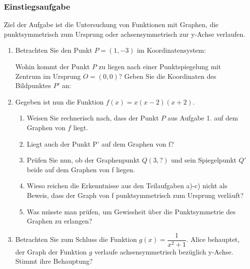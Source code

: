 \subsubsection{Einstiegsaufgabe}
Ziel der Aufgabe ist die Untersuchung von Funktionen mit Graphen, die punktsymmetrisch zum Ursprung oder achsensymmetrisch zur y-Achse verlaufen.
\begin{enumerate}
    \item Betrachten Sie den Punkt $P=(1,-3)$ im Koordinatensystem:
          \begin{center}
          \end{center}
          Wohin kommt der Punkt $P$ zu liegen nach einer Punktspiegelung mit Zentrum im Ursprung $O=(0,0)$? Geben Sie die Koordinaten des Bildpunktes $P'$ an:
          \vspace{1cm}

    \item Gegeben ist nun die Funktion $f(x)=x(x-2)(x+2)$.
          \begin{enumerate}
              \item Weisen Sie rechnerisch nach, dass der Punkt $P$ aus Aufgabe 1. auf dem Graphen von $f$ liegt.
              \item Liegt auch der Punkt P' auf dem Graphen von f?
              \item Prüfen Sie nun, ob der Graphenpunkt $Q(3,?)$ und sein Spiegelpunkt $Q'$ beide auf dem Graphen von f liegen.
              \item Wieso reichen die Erkenntnisse aus den Teilaufgaben a)-c) nicht als Beweis, dass der Graph von f punktsymmetrisch zum Ursprung verläuft?
              \item Was müsste man prüfen, um Gewissheit über die Punktsymmetrie des Graphen zu erlangen?
          \end{enumerate}
    \item Betrachten Sie zum Schluss die Funktion $g(x)=\dfrac{1}{x^2+1}$. Alice behauptet, der Graph der Funktion $g$ verlaufe achsensymmetrisch bezüglich y-Achse. Stimmt ihre Behauptung?
\end{enumerate}
